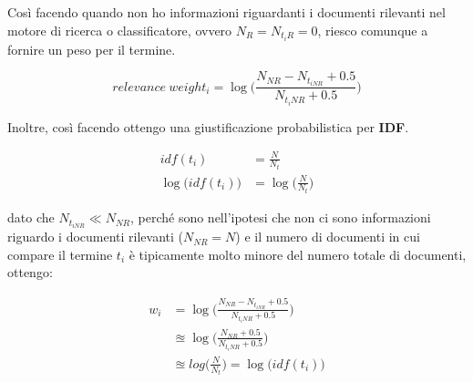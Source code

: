 \noindent Così facendo quando non ho informazioni riguardanti i documenti rilevanti nel motore di ricerca o classificatore, ovvero $N_R = N_{t_iR} = 0 $, riesco comunque a fornire un peso per il termine. 

$$
relevance \ weight_i = \log\bigg( \frac{N_{NR} - N_{t_{iNR}}+ 0.5}{N_{t_iNR}+ 0.5} \bigg)
$$

\noindent Inoltre, così facendo ottengo una giustificazione probabilistica per \textbf{IDF}.

\begin{align*}
idf(t_i)				&=  \frac{N}{N_t} \\
\log\big(idf(t_i) \big) &= \log\big( \frac{N}{N_t}\big) 
\end{align*}

dato che $N_{t_{iNR}} \ll N_{NR}$, perché sono nell'ipotesi che non ci sono informazioni riguardo i documenti rilevanti ($N_{NR} = N$) e il numero di documenti in cui compare il termine $t_i$ è tipicamente molto minore del numero totale di documenti, ottengo:

\begin{align*}
w_i &=\log\bigg( \frac{N_{NR} - N_{t_{iNR}}+ 0.5}{N_{t_iNR}+ 0.5} \bigg) \\
    &\approxeq \log\bigg( \frac{N_{NR} + 0.5}{N_{t_iNR}+ 0.5} \bigg) \\
    &\approxeq log\big( \frac{N}{N_t}\big) = \log\big(idf(t_i) \big)
\end{align*}















